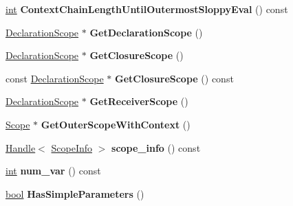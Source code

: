 \begin{DoxyCompactItemize}
\mbox{\hyperlink{classint}{int}} {\bfseries Context\+Chain\+Length\+Until\+Outermost\+Sloppy\+Eval} () const
\item 
\mbox{\label{classv8_1_1internal_1_1Scope_acf89842a02fe0625adf351f8bc7e8724}} 
\mbox{\hyperlink{classv8_1_1internal_1_1DeclarationScope}{Declaration\+Scope}} $\ast$ {\bfseries Get\+Declaration\+Scope} ()
\item 
\mbox{\label{classv8_1_1internal_1_1Scope_a91d59aeb67e0a52f2b1dd240d48d90cd}} 
\mbox{\hyperlink{classv8_1_1internal_1_1DeclarationScope}{Declaration\+Scope}} $\ast$ {\bfseries Get\+Closure\+Scope} ()
\item 
\mbox{\label{classv8_1_1internal_1_1Scope_ad285924c682fd94713ebb607eeafb780}} 
const \mbox{\hyperlink{classv8_1_1internal_1_1DeclarationScope}{Declaration\+Scope}} $\ast$ {\bfseries Get\+Closure\+Scope} () const
\item 
\mbox{\label{classv8_1_1internal_1_1Scope_a58016da166b39f5eec7ade6022433956}} 
\mbox{\hyperlink{classv8_1_1internal_1_1DeclarationScope}{Declaration\+Scope}} $\ast$ {\bfseries Get\+Receiver\+Scope} ()
\item 
\mbox{\label{classv8_1_1internal_1_1Scope_a30b7062faf867babf50825847c728546}} 
\mbox{\hyperlink{classv8_1_1internal_1_1Scope}{Scope}} $\ast$ {\bfseries Get\+Outer\+Scope\+With\+Context} ()
\item 
\mbox{\label{classv8_1_1internal_1_1Scope_ae3f883985bfe91e88dcdf6c19b231955}} 
\mbox{\hyperlink{classv8_1_1internal_1_1Handle}{Handle}}$<$ \mbox{\hyperlink{classv8_1_1internal_1_1ScopeInfo}{Scope\+Info}} $>$ {\bfseries scope\+\_\+info} () const
\item 
\mbox{\label{classv8_1_1internal_1_1Scope_a0d320676b13824ec0cbf1b50ede6a938}} 
\mbox{\hyperlink{classint}{int}} {\bfseries num\+\_\+var} () const
\item 
\mbox{\label{classv8_1_1internal_1_1Scope_a0096f909ee7cf117d80cbe12553f7f0d}} 
\mbox{\hyperlink{classbool}{bool}} {\bfseries Has\+Simple\+Parameters} ()

\end{DoxyCompactItemize}
